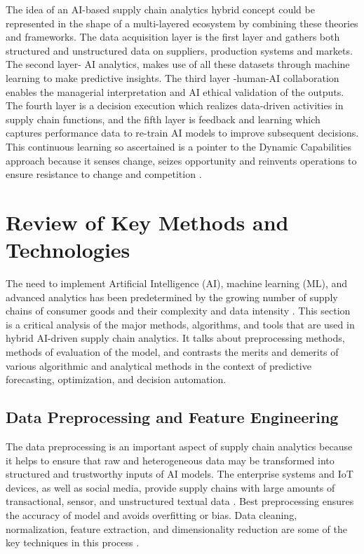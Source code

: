 The idea of an AI-based supply chain analytics hybrid concept could be represented in the shape of a multi-layered ecosystem by combining these theories and frameworks. The data acquisition layer is the first layer and gathers both structured and unstructured data on suppliers, production systems and markets. The second layer- AI analytics, makes use of all these datasets through machine learning to make predictive insights. The third layer -human-AI collaboration enables the managerial interpretation and AI ethical validation of the outputs. The fourth layer is a decision execution which realizes data-driven activities in supply chain functions, and the fifth layer is feedback and learning which captures performance data to re-train AI models to improve subsequent decisions. This continuous learning so ascertained is a pointer to the Dynamic Capabilities approach because it senses change, seizes opportunity and reinvents operations to ensure resistance to change and competition \autocite{herath2023}.


\section{Review of Key Methods and Technologies}

The need to implement Artificial Intelligence (AI), machine learning (ML), and advanced analytics has been predetermined by the growing number of supply chains of consumer goods and their complexity and data intensity \autocite{samuels2025examining, sharma2022role}. This section is a critical analysis of the major methods, algorithms, and tools that are used in hybrid AI-driven supply chain analytics. It talks about preprocessing methods, methods of evaluation of the model, and contrasts the merits and demerits of various algorithmic and analytical methods in the context of predictive forecasting, optimization, and decision automation.

\subsection{Data Preprocessing and Feature Engineering}

The data preprocessing is an important aspect of supply chain analytics because it helps to ensure that raw and heterogeneous data may be transformed into structured and trustworthy inputs of AI models. The enterprise systems and IoT devices, as well as social media, provide supply chains with large amounts of transactional, sensor, and unstructured textual data \autocite{sodhi2021supply}. Best preprocessing ensures the accuracy of model and avoids overfitting or bias. Data cleaning, normalization, feature extraction, and dimensionality reduction are some of the key techniques in this process \autocite{Min2022BigDataAI}.

